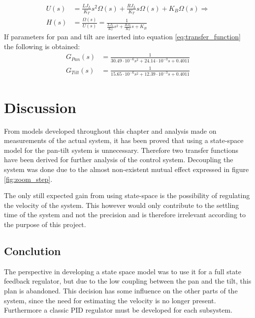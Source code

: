 \begin{align}
	U(s) &= \frac{L J_L}{K_T} s^2 \Omega(s) + \frac{R J_L}{K_T} s \Omega(s) + K_B \Omega(s) \Rightarrow\\
	H(s) &= \frac{\Omega(s)}{U(s)} = \frac{1}{\frac{L J_L}{K_T} s^2 + \frac{R J_L}{K_T} s + K_B}\label{eq:transfer_function}
\end{align}
If parameters for pan and tilt are inserted into equation \ref{eq:transfer_function} the following is obtained:
\begin{align}
	G_{Pan}(s) &= \frac{1}{30.49 \cdot 10^{-6} s^2 + 24.14 \cdot 10^{-3} s + 0.4011}\label{eq:transfer_function_pan}\\
	G_{Tilt}(s) &= \frac{1}{15.65 \cdot 10^{-6} s^2 + 12.39 \cdot 10^{-3} s + 0.4011}\label{eq:transfer_function_tilt}
\end{align}

\section{Discussion}
From models developed throughout this chapter and analysis made on measurements of the actual system, it has been proved that using a state-space model for the pan-tilt system is unnecessary. Therefore two transfer functions have been derived for further analysis of the control system. Decoupling the system was done due to the almost non-existent mutual effect expressed in figure \ref{fig:zoom_step}.

The only still expected gain from using state-space is the possibility of regulating the velocity of the system. This however would only contribute to the settling time of the system and not the precision and is therefore irrelevant according to the purpose of this project.

\subsection{Conclution}
The perspective in developing a state space model was to use it for a full state feedback regulator, but due to the low coupling between the pan and the tilt, this plan is abandoned. This decision has some influence on the other parts of the system, since the need for estimating the velocity is no longer present. Furthermore a classic PID regulator must be developed for each subsystem.
